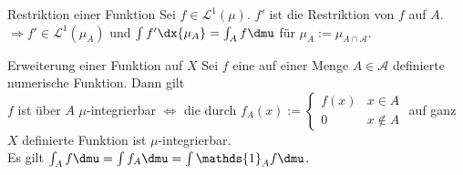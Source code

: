 \begin{karte}{Restriktion einer Funktion}
	Sei \(f \in \mathcal{L}^1(\mu)\). \(f'\) ist die Restriktion von \(f\) auf \(A\).\\
	\( \Rightarrow f' \in \mathcal{L}^1(\mu_A)\) und \( \int f' \dx{\mu_A} = \int_A f \dmu \) für \( \mu_A := \mu_{A \cap \mathcal{A}} \).
\end{karte}

\begin{karte}{Erweiterung einer Funktion auf \(X\)}
	Sei \( f \) eine auf einer Menge \(A \in \mathcal{A}\) definierte numerische Funktion. Dann gilt \\
	\(f\) ist über \( A \) \(\mu\)-integrierbar \( \Leftrightarrow \) 
	die durch \( f_A(x) := \begin{cases}
	f(x) & x\in A\\ 0 & x \notin A
	\end{cases} \) auf ganz \(X\) definierte Funktion ist \(\mu\)-integrierbar.\\
	Es gilt \( \int_A f \dmu = \int f_A \dmu = \int \mathds{1}_A f \dmu \).
\end{karte}